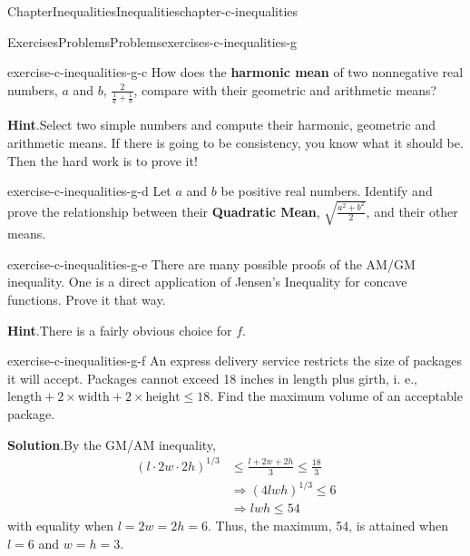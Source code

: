 \documentclass[oneside,10pt,]{book}
\newcommand{\blocktitlefont}{\relax}
\newcommand{\terminology}[1]{\textbf{#1}}
\numberwithin{equation}{section}
\begin{document}
\begin{chapterptx}{Chapter}{Inequalities}{}{Inequalities}{}{}{chapter-c-inequalities}
\begin{exercises-section}{Exercises}{Problems}{}{Problems}{}{}{exercises-c-inequalities-g}
\begin{divisionexercise}{2}{}{}{exercise-c-inequalities-g-c}
%
How does the \terminology{harmonic mean} of two nonnegative real numbers, \(a\) and \(b\),  \(\frac{2}{\frac{1}{a}+\frac{1}{b}}\), compare with their geometric and arithmetic means?%
\par\smallskip%
\noindent\textbf{\blocktitlefont Hint}.\hypertarget{hint-c-inequalities-g-c-c}{}\quad{}Select two simple numbers and compute their harmonic, geometric and arithmetic means.  If there is going to be consistency, you know what it should be.  Then the hard work is to prove it!%
\end{divisionexercise}%
\begin{divisionexercise}{3}{}{}{exercise-c-inequalities-g-d}%
%
Let \(a\) and \(b\) be positive real numbers. Identify and prove the relationship between their \terminology{Quadratic Mean}, \(\sqrt{\frac{a^2 + b^2}{2}}\), and their other means.%
\end{divisionexercise}%
\begin{divisionexercise}{4}{}{}{exercise-c-inequalities-g-e}%
There are many possible proofs of the AM\slash{}GM inequality.  One is a direct application of Jensen's Inequality for concave functions.  Prove it that way.%
\par\smallskip%
\noindent\textbf{\blocktitlefont Hint}.\hypertarget{hint-c-inequalities-g-e-b}{}\quad{}There is a fairly obvious choice for \(f\).%
\end{divisionexercise}%
\begin{divisionexercise}{5}{}{}{exercise-c-inequalities-g-f}%
An express delivery service restricts the size of packages it will accept.  Packages cannot exceed 18 inches in length plus girth, i. e., \(\text{length}+2\times\text{width} +2\times \text{height}\leq 18\).  Find the maximum volume of an acceptable package.%
\par\smallskip%
\noindent\textbf{\blocktitlefont Solution}.\hypertarget{solution-c-inequalities-g-f-b}{}\quad{}By the GM\slash{}AM inequality,%
\begin{equation*}
\begin{split}
(l \cdot 2w \cdot 2h)^{1/3} & \leq \frac{l+2w+2h}{3}\leq \frac{18}{3}\\
& \Rightarrow (4 l w h)^{1/3} \leq 6\\
& \Rightarrow  l w h \leq 54
\end{split}
\end{equation*}
with equality when \(l = 2w = 2h = 6\). Thus, the maximum, 54, is attained when \(l=6\) and \(w=h=3\).%
\par

\end{divisionexercise}
\end{exercises-section}
\end{chapterptx}
\end{document}
